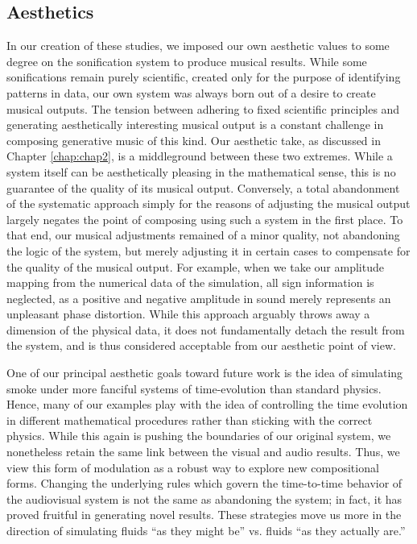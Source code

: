 \subsection{Aesthetics}
In our creation of these studies, we imposed our own aesthetic values to some degree on the sonification system to produce musical results. While some sonifications remain purely scientific, created only for the purpose of identifying patterns in data, our own system was always born out of a desire to create musical outputs. The tension between adhering to fixed scientific principles and generating aesthetically interesting musical output is  a constant challenge in composing generative music of this kind. Our aesthetic take, as discussed in Chapter \ref{chap:chap2}, is a middleground between these two extremes. While a system itself can be aesthetically pleasing in the mathematical sense, this is no guarantee of the quality of its musical output. Conversely, a total abandonment of the systematic approach simply for the reasons of adjusting the musical output largely negates the point of composing using such a system in the first place. To that end, our musical adjustments remained of a minor quality, not abandoning the logic of the system, but merely adjusting it in certain cases to compensate for the quality of the musical output. For example, when we take our amplitude mapping from the numerical data of the simulation, all sign information is neglected, as a positive and negative amplitude in sound merely represents an unpleasant phase distortion. While this approach arguably throws away a dimension of the physical data, it does not fundamentally detach the result from the system, and is thus considered acceptable from our aesthetic point of view.

One of our principal aesthetic goals toward future work is the idea of simulating smoke under more fanciful systems of time-evolution than standard physics. Hence, many of our examples play with the idea of controlling the time evolution in different mathematical procedures rather than sticking with the correct physics. While this again is pushing the boundaries of our original system, we nonetheless retain the same link between the visual and audio results. Thus, we view this form of modulation as
a robust way to explore new compositional forms. Changing the underlying rules which govern the time-to-time behavior of the audiovisual system is not the same as abandoning the system; in fact, it has proved fruitful in generating novel results. These strategies move us more in the direction of simulating fluids ``as they might be'' vs. fluids ``as they actually are.''